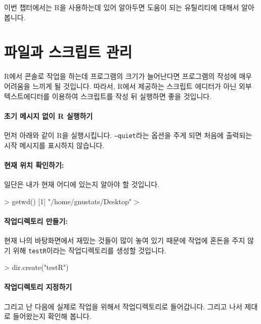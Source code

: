 이번 챕터에서는 R을 사용하는데 있어 알아두면 도움이 되는 유틸리티에 대해서 알아봅니다.


\section{파일과 스크립트 관리}

R에서 콘솔로 작업을 하는데 프로그램의 크기가 늘어난다면 프로그램의 작성에 매우 어려움을 느끼게 될 것입니다.
따라서, R에서 제공하는 스크립트 에디터가 아닌 외부 텍스트에디터를 이용하여 스크립트를 작성 뒤 실행하면 좋을 것입니다.

\paragraph{초기 메시지 없이 R 실행하기}
먼저 아래와 같이 R을 실행시킵니다. 
\texttt{--quiet}라는 옵션을 주게 되면 처음에 출력되는 시작 메시지를 표시하지 않습니다. 

\begin{Schunk}
\end{Schunk}

\paragraph{현재 위치 확인하기:}
일단은 내가 현재 어디에 있는지 알아야 할 것입니다.
\begin{Schunk}
\begin{Soutput}
> getwd()
[1] "/home/gnustats/Desktop"
> 
\end{Soutput}
\end{Schunk}

\paragraph{작업디렉토리 만들기:}
현재 나의 바탕화면에서 재밌는 것들이 많이 놓여 있기 때문에 작업에 혼돈을 주지 않기 위해 \texttt{testR}이라는 작업디렉토리를 생성할 것입니다. 
\begin{Schunk}
\begin{Soutput}
> dir.create("testR")
\end{Soutput}
\end{Schunk}

\paragraph{작업디렉토리 지정하기}
그리고 난 다음에 실제로 작업을 위해서 작업디렉토리로 들어갑니다. 
그리고 나서 제대로 들어왔는지 확인해 봅니다. 

